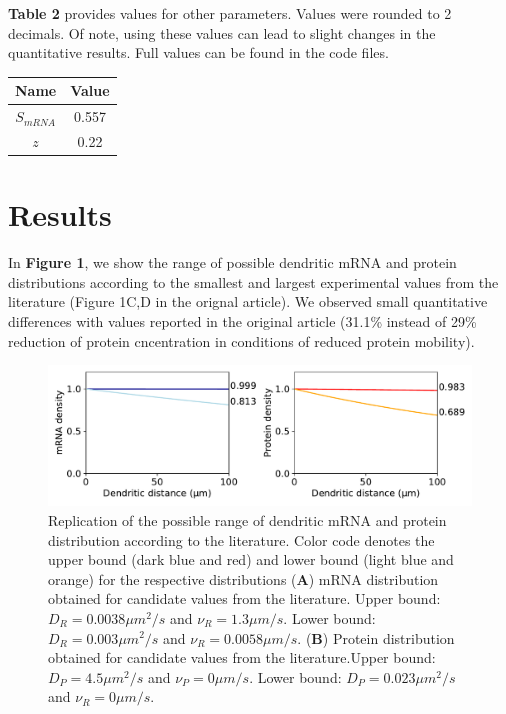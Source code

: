 \textbf{Table 2} provides values for other parameters. Values were rounded to 2 decimals. Of note, using these values can lead to slight changes in the quantitative results. Full values can be found in the code files.

\begin{center}
  \begin{tabular}{|c|c|}
    \hline
    Name & Value \\
    \hline
    $S_{mRNA}$ & 0.557 \\
    \hline
    $z$ & 0.22 \\
    \hline
  \end{tabular}
\end{center}


\section{Results}

In \textbf{Figure 1}, we show the range of possible dendritic mRNA and protein distributions according to the smallest and largest experimental values from the literature (Figure 1C,D in the orignal article). We observed small quantitative differences with values reported in the original article (31.1\% instead of 29\% reduction of protein cncentration in conditions of reduced protein mobility).  

\begin{figure}[H]
  \includegraphics[width=\textwidth]{Figure1.pdf}
  \caption{Replication of the possible range of dendritic mRNA and protein distribution according to the literature.  Color code denotes the upper bound (dark blue and red) and lower bound (light blue and orange) for the respective distributions (\textbf{A}) mRNA distribution obtained for candidate values from the literature. Upper bound: $D_{R} = 0.0038\mu m^{2}/s$ and $\nu_{R}=1.3\mu m/s$. Lower bound:  $D_{R} = 0.003\mu m^{2}/s$ and $\nu_{R}=0.0058\mu m/s$. (\textbf{B}) Protein distribution obtained for candidate values from the literature.Upper bound: $D_{P} = 4.5\mu m^{2}/s$ and $\nu_{P}=0\mu m/s$. Lower bound:  $D_{P} = 0.023\mu m^{2}/s$ and $\nu_{R}=0\mu m/s$.} 
\end{figure}

